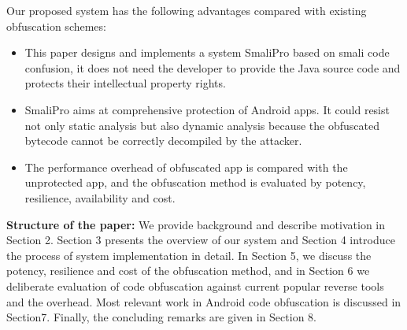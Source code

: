 Our proposed system has the following advantages compared with existing obfuscation schemes:
\begin{itemize}[leftmargin=*]
\item This paper designs and implements a system SmaliPro based on smali code confusion, it does not need the developer to provide the Java source code and protects their intellectual property rights.
\item SmaliPro aims at comprehensive protection of Android apps. It could resist not only static analysis but also dynamic analysis because the obfuscated bytecode cannot be correctly decompiled by the attacker.
\item The performance overhead of obfuscated app is compared with the unprotected app, and the obfuscation method is evaluated by potency, resilience, availability and cost.
\end{itemize}

\textbf{Structure of the paper:} We provide background and describe motivation in Section 2. Section 3 presents the overview of our system and Section 4 introduce the process of system implementation in detail. In Section 5, we discuss the potency, resilience and cost of the obfuscation method, and in Section 6 we deliberate evaluation of code obfuscation against current popular reverse tools and the overhead. Most relevant work in Android code obfuscation is discussed in Section7. Finally, the concluding remarks are given in Section 8. 